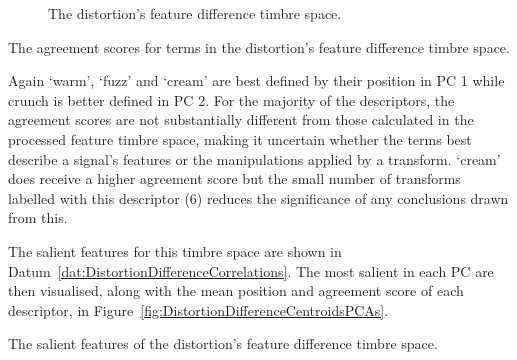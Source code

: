 \begin{figure}[h!]
{					\label{fig:DistortionDifferencePCA3-2}
				}
				\caption{The distortion's feature difference timbre space.}
				\label{fig:DistortionDifferencePCAs}
			\end{figure}

			\begin{table}[h!]
				\centering
				
				\centering
				\caption{The agreement scores for terms in the 
					 distortion's feature difference timbre space.}
				\label{tab:DistortionDifferenceAgreements}
			\end{table}

			Again `warm', `fuzz' and `cream' are best defined by their position in PC 1 while crunch is better
			defined in PC 2. For the majority of the descriptors, the agreement scores are not substantially
			different from those calculated in the processed feature timbre space, making it uncertain whether
			the terms best describe a signal's features or the manipulations applied by a transform. `cream'
			does receive a higher agreement score but the small number of transforms labelled with this
			descriptor (6) reduces the significance of any conclusions drawn from this.

			The salient features for this timbre space are shown in
			Datum~\ref{dat:DistortionDifferenceCorrelations}. The most salient in each PC are then visualised,
			along with the mean position and agreement score of each descriptor, in
			Figure~\ref{fig:DistortionDifferenceCentroidsPCAs}. 

			\begin{datum}[h!]
				\centering
				\begin{minipage}{0.9\textwidth}
					
				\end{minipage}
				\caption{The salient features of the distortion's
					 feature difference timbre space.}
				\label{dat:DistortionDifferenceCorrelations}
			\end{datum}

